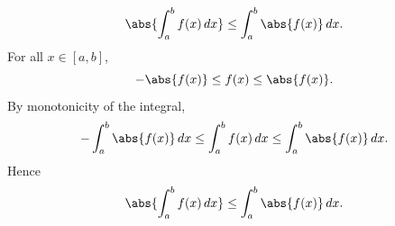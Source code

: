 

\begin{proposition}{
    \[
        \abs{\int_a^b f(x)\,dx}\leq\int_a^b\abs{f(x)}\,dx.
    \]
}
    For all $x\in[a,b]$,
    \[
        -\abs{f(x)} \leq f(x) \leq \abs{f(x)}.
    \]
    By monotonicity of the integral,
    \[
        -\int_a^b \abs{f(x)}\,dx \leq \int_a^b f(x)\,dx \leq \int_a^b \abs{f(x)}\,dx.
    \]
    Hence
    \[
        \abs{\int_a^b f(x)\,dx}\leq\int_a^b\abs{f(x)}\,dx.
    \]
\end{proposition}